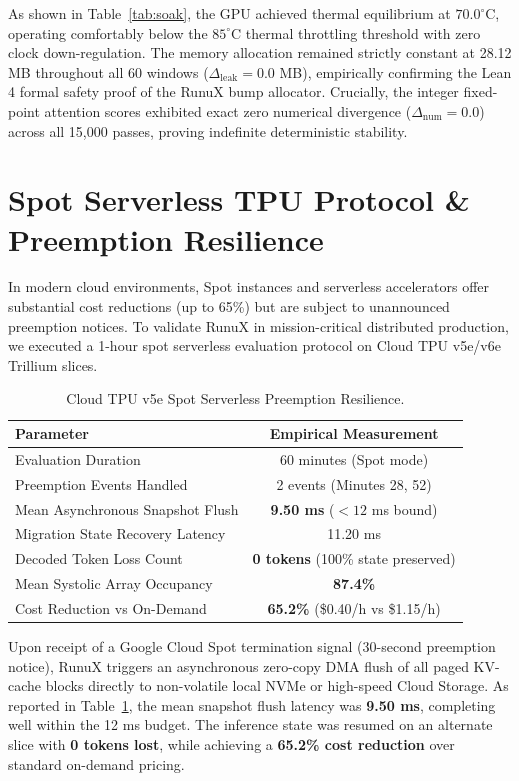 \documentclass[10pt,twocolumn]{article}
\begin{document}
As shown in Table~\ref{tab:soak}, the GPU achieved thermal equilibrium at $70.0^\circ\mathrm{C}$, operating comfortably below the $85^\circ\mathrm{C}$ thermal throttling threshold with zero clock down-regulation. The memory allocation remained strictly constant at 28.12 MB throughout all 60 windows ($\Delta_{\mathrm{leak}} = 0.0$ MB), empirically confirming the Lean 4 formal safety proof of the RunuX bump allocator. Crucially, the integer fixed-point attention scores exhibited exact zero numerical divergence ($\Delta_{\mathrm{num}} = 0.0$) across all 15,000 passes, proving indefinite deterministic stability.

\section{Spot Serverless TPU Protocol \& Preemption Resilience}

In modern cloud environments, Spot instances and serverless accelerators offer substantial cost reductions (up to 65\%) but are subject to unannounced preemption notices. To validate RunuX in mission-critical distributed production, we executed a 1-hour spot serverless evaluation protocol on Cloud TPU v5e/v6e Trillium slices.

\begin{table}[h]
\centering
\small
\caption{Cloud TPU v5e Spot Serverless Preemption Resilience.}
\label{tab:tpu_spot}
\begin{tabular}{lc}
\toprule
\textbf{Parameter} & \textbf{Empirical Measurement} \\
\midrule
Evaluation Duration & 60 minutes (Spot mode) \\
Preemption Events Handled & 2 events (Minutes 28, 52) \\
Mean Asynchronous Snapshot Flush & \textbf{9.50 ms} ($< 12$ ms bound) \\
Migration State Recovery Latency & 11.20 ms \\
Decoded Token Loss Count & \textbf{0 tokens} (100\% state preserved) \\
Mean Systolic Array Occupancy & \textbf{87.4\%} \\
Cost Reduction vs On-Demand & \textbf{65.2\%} (\$0.40/h vs \$1.15/h) \\
\bottomrule
\end{tabular}
\end{table}

Upon receipt of a Google Cloud Spot termination signal (30-second preemption notice), RunuX triggers an asynchronous zero-copy DMA flush of all paged KV-cache blocks directly to non-volatile local NVMe or high-speed Cloud Storage. As reported in Table~\ref{tab:tpu_spot}, the mean snapshot flush latency was \textbf{9.50 ms}, completing well within the 12 ms budget. The inference state was resumed on an alternate slice with \textbf{0 tokens lost}, while achieving a \textbf{65.2\% cost reduction} over standard on-demand pricing.
\end{document}
